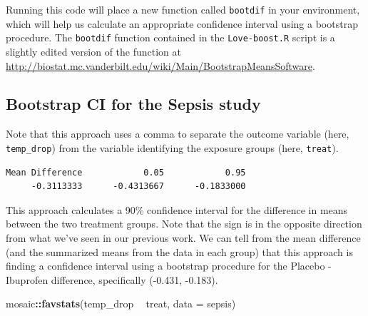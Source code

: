 \documentclass[
]{book}
\newenvironment{Shaded}{\begin{snugshade}}{\end{snugshade}}
\newcommand{\DataTypeTok}[1]{\textcolor[rgb]{0.13,0.29,0.53}{#1}}
\newcommand{\DecValTok}[1]{\textcolor[rgb]{0.00,0.00,0.81}{#1}}
\newcommand{\FloatTok}[1]{\textcolor[rgb]{0.00,0.00,0.81}{#1}}
\newcommand{\KeywordTok}[1]{\textcolor[rgb]{0.13,0.29,0.53}{\textbf{#1}}}
\newcommand{\NormalTok}[1]{#1}
\newcommand{\OperatorTok}[1]{\textcolor[rgb]{0.81,0.36,0.00}{\textbf{#1}}}
\newcommand{\StringTok}[1]{\textcolor[rgb]{0.31,0.60,0.02}{#1}}
\begin{document}
Running this code will place a new function called \texttt{bootdif} in your environment, which will help us calculate an appropriate confidence interval using a bootstrap procedure. The \texttt{bootdif} function contained in the \texttt{Love-boost.R} script is a slightly edited version of the function at \url{http://biostat.mc.vanderbilt.edu/wiki/Main/BootstrapMeansSoftware}.

\hypertarget{bootstrap-ci-for-the-sepsis-study}{%
\subsection{Bootstrap CI for the Sepsis study}\label{bootstrap-ci-for-the-sepsis-study}}

Note that this approach uses a comma to separate the outcome variable (here, \texttt{temp\_drop}) from the variable identifying the exposure groups (here, \texttt{treat}).

\begin{Shaded}
\end{Shaded}

\begin{verbatim}
Mean Difference            0.05            0.95 
     -0.3113333      -0.4313667      -0.1833000 
\end{verbatim}

This approach calculates a 90\% confidence interval for the difference in means between the two treatment groups. Note that the sign is in the opposite direction from what we've seen in our previous work. We can tell from the mean difference (and the summarized means from the data in each group) that this approach is finding a confidence interval using a bootstrap procedure for the Placebo - Ibuprofen difference, specifically (-0.431, -0.183).

\begin{Shaded}
\begin{Highlighting}[]
\NormalTok{mosaic}\OperatorTok{::}\KeywordTok{favstats}\NormalTok{(temp_drop }\OperatorTok{~}\StringTok{ }\NormalTok{treat, }\DataTypeTok{data =}\NormalTok{ sepsis)}
\end{Highlighting}
\end{Shaded}
\end{document}
